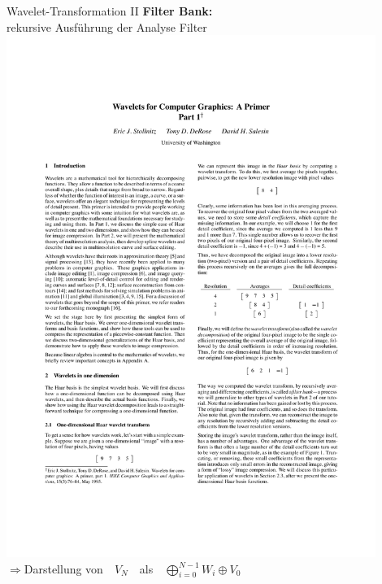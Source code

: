 	\begin{frame}{Wavelet-Transformation II}
		\alert{\bf Filter Bank:}\\rekursive Ausführung der Analyse Filter\vspace{10mm}\\
		{\centering\includegraphics[page=11, trim=60 695 305 100, clip, width=0.9\textwidth]{4_wavelet_final[14255].pdf}\vspace{12mm}}\\ \pause
		\large$\Rightarrow$\qquad Darstellung von\ \ $V_N$\ \ als\ \ $\bigoplus_{i=0}^{N-1}W_i\oplus V_0$
	\end{frame}

